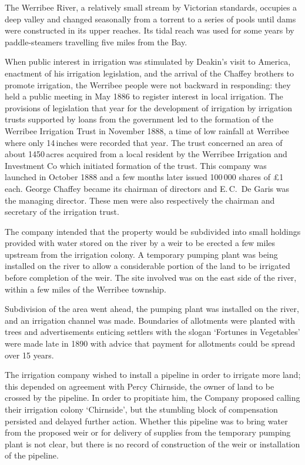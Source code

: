 The Werribee River, a relatively small stream by Victorian standards,
occupies a deep valley and changed seasonally from a torrent to a
series of pools until dams were constructed in its upper reaches.  Its
tidal reach was used for some years by paddle-steamers travelling five
miles from the Bay.

When public interest in irrigation was stimulated by Deakin's visit to
America, enactment of his irrigation legislation, and the arrival of
the Chaffey brothers to promote irrigation, the Werribee people were
not backward in responding: they held a public meeting in May 1886 to
register interest in local irrigation.  The provisions of legislation
that year for the development of irrigation by irrigation trusts
supported by loans from the government led to the formation of the
Werribee Irrigation Trust in November 1888, a time of low rainfall at
Werribee where only 14\,inches were recorded that year.  The trust
concerned an area of about 1450\,acres acquired from a local resident
by the Werribee Irrigation and Investment Co which initiated formation
of the trust.  This company was launched in October 1888 and a few
months later issued 100\,000 shares of \pounds1 each.  George Chaffey
became its chairman of directors and E.\,C.~De Garis was the managing
director.  These men were also respectively the chairman and secretary
of the irrigation trust.

The company intended that the property would be subdivided into small
holdings provided with water stored on the river by a weir to be
erected a few miles upstream from the irrigation colony.  A temporary
pumping plant was being installed on the river to allow a considerable
portion of the land to be irrigated before completion of the weir.
The site involved was on the east side of the river, within a few
miles of the Werribee township.

Subdivision of the area went ahead, the pumping plant was installed on
the river, and an irrigation channel was made.  Boundaries of
allotments were planted with trees and advertisements enticing
settlers with the slogan `Fortunes in Vegetables' were made late in
1890 with advice that payment for allotments could be spread over 15
years.

The irrigation company wished to install a pipeline in order to
irrigate more land; this depended on agreement with Percy Chirnside,
the owner of land to be crossed by the pipeline.  In order to
propitiate him, the Company proposed calling their irrigation colony
`Chirnside', but the stumbling block of compensation persisted and
delayed further action.  Whether this pipeline was to bring water from
the proposed weir or for delivery of supplies from the temporary
pumping plant is not clear, but there is no record of construction of
the weir or installation of the pipeline.

